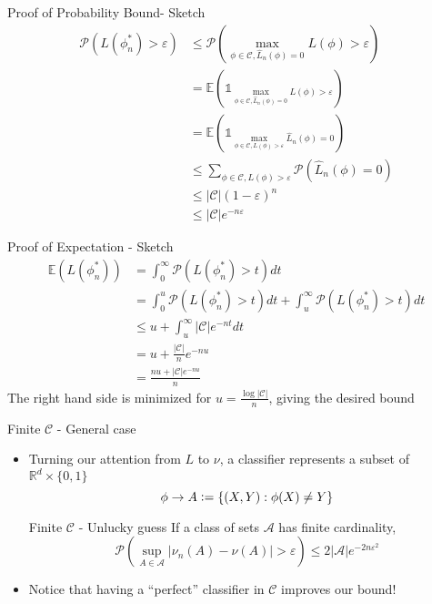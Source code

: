 \documentclass{beamer}
\renewcommand{\Pr}[1]{\mathcal{P} \left( #1 \right)}
\newcommand{\cls}{\mathcal{C}}
\newcommand{\E}[1]{\mathbb{E}\left( #1 \right)}
\newcommand{\R}{\mathbb{R}}
\newcommand{\defeq}{\vcentcolon=}
\newcommand{\pa}[1]{\left( #1 \right)}
\newcommand{\abs}[1]{\left| #1 \right|}
\newcommand{\br}[1]{\left\{ #1 \right\} }
\newcommand{\eps}{\varepsilon}
\begin{document}
\begin{frame}{Proof of Probability Bound- Sketch}
\begin{align*}
\Pr{ L(\phi^*_n) > \eps } & \leq \Pr{ \max_{\phi \in \cls, \hat{L}_n(\phi) = 0} L(\phi) > \eps} \\
	& = \E{ \mathds{1}_{\max_{\phi \in \cls, \hat{L}_n(\phi) = 0} L(\phi) > \eps}} \\
	& = \E {\mathds{1}_{\max_{ \phi \in \cls, L(\phi) > \eps} \hat{L}_n(\phi) = 0}} \\
	& \leq  \sum_{\phi \in \cls, L(\phi) > \eps} \Pr{ \hat{L}_n (\phi) = 0}  \\
	& \leq \abs{\cls} \pa{1-\eps}^n \\
	& \leq \abs{\cls} e^{-n\eps} \end{align*}
\end{frame}

\begin{frame}{Proof of Expectation - Sketch}
\begin{align*}
\E{L(\phi^*_n)} &= \int_0^\infty \Pr{L(\phi^*_n) > t} dt \\
	&= \int_0^u \Pr{L(\phi^*_n) > t} dt + \int_u^\infty \Pr{L(\phi^*_n) > t} dt \\
	& \leq u + \int_u^\infty \abs{\cls}e^{-nt} dt \\
	& = u + \frac{\abs{\cls}}n e^{-nu}\\
	& = \frac{ nu+ \abs{\cls}e^{-nu}}n
\end{align*}
The right hand side is minimized for $u = \frac{\log\abs{\cls}}n$, giving the desired bound
\end{frame}


\begin{frame}{Finite $\cls$ - General case}
\begin{itemize}
\item Turning our attention from $L$ to $\nu$, a classifier represents a subset of $\R^d \times \{0,1\}$ 
\[ \phi \to A \defeq \br{ (X,Y) : \phi(X) \ne Y}\]
\begin{block}{Finite $\cls$ - Unlucky guess}
If a class of sets $\mathcal{A}$ has finite cardinality, 
\[ \Pr{ \sup_{A\in \mathcal{A}} \abs{\nu_n(A) - \nu(A)} > \eps} \leq 2\abs{\mathcal{A}} e^{-2n\eps^2} \]
\end{block}
\item Notice that having a ``perfect'' classifier in $\cls$ improves our bound!
\end{itemize}
\end{frame}
\end{document}
